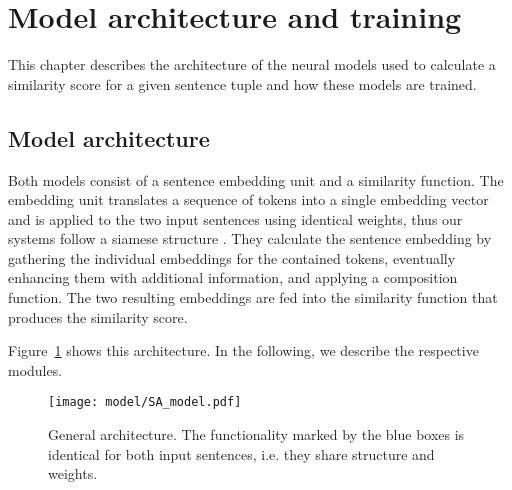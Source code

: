 \section{Model architecture and training}
This chapter describes the architecture of the neural models used to calculate a similarity score for a given sentence tuple and how these models are trained.

\subsection{Model architecture} \label{subsec:architecture}
Both models consist of a sentence embedding unit and a similarity function. The embedding unit translates a sequence of tokens into a single embedding vector and is applied to the two input sentences using identical weights, thus our systems follow a siamese structure \autocite{bromley_signature_1994}. %
They calculate the sentence embedding by gathering the individual embeddings for the contained tokens, eventually enhancing them with additional information, and applying a composition function. The two resulting embeddings are fed into the similarity function that produces the similarity score. 

Figure~\ref{fig:model_architecture} shows this architecture. In the following, we describe the respective modules. 

\begin{figure}[htb!]
	\centering
	\texttt{[image: model/SA\_model.pdf]}
	\caption{General architecture. The functionality marked by the blue boxes is identical for both input sentences, i.e. they share structure and weights.}
	\label{fig:model_architecture}
\end{figure}

